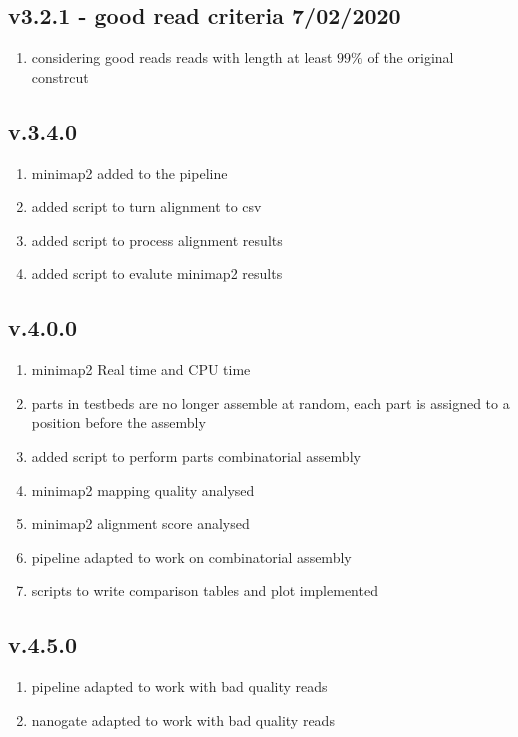 \documentclass[11pt, a4paper]{article}
\begin{document}
\subsection{v3.2.1 - good read criteria 7/02/2020}
\begin{enumerate}
\item considering good reads reads with length at least $99\%$ of the original constrcut 
\end{enumerate}

\subsection{v.3.4.0}
\begin{enumerate}
\item minimap2 added to the pipeline
\item added script to turn alignment to csv
\item added script to process alignment results
\item added script to evalute minimap2 results  
\end{enumerate}

\subsection{v.4.0.0}
\begin{enumerate}
\item minimap2 Real time and CPU time 
\item parts in testbeds are no longer assemble at random, each part is assigned to a position before the assembly
\item added script to perform parts combinatorial assembly
\item minimap2 mapping quality analysed
\item minimap2 alignment score analysed
\item pipeline adapted to work on combinatorial assembly 
\item scripts to write comparison tables and plot implemented
\end{enumerate}

\subsection{v.4.5.0}
\begin{enumerate}
\item pipeline adapted to work with bad quality reads
\item nanogate adapted to work with bad quality reads  
\end{enumerate}
\end{document}
